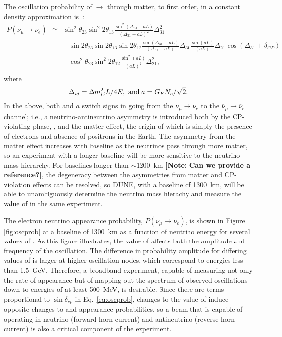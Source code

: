 The oscillation probability of \numu $\rightarrow$ \nue through matter, 
to first order, in a constant density
approximation is~\cite{Nunokawa:2007qh}:
%
\begin{eqnarray}
\label{eq:oscprob}
P(\nu_\mu \rightarrow \nu_e) & \simeq & \sin^2 \theta_{23} \sin^2 2 \theta_{13} 
\frac{ \sin^2(\Delta_{31} - aL)}{(\Delta_{31}-aL)^2} \Delta_{31}^2\\ \nonumber
& & + \sin 2 \theta_{23} \sin 2 \theta_{13} \sin 2 \theta_{12} \frac{ \sin(\Delta_{31} - aL)}{(\Delta_{31}-aL)} \Delta_{31} \frac{\sin(aL)}{(aL)} \Delta_{21} \cos (\Delta_{31} + \delta_{CP})\\ \nonumber
& & + \cos^2 \theta_{23} \sin^2 2 \theta_{12} \frac {\sin^2(aL)}{(aL)^2} \Delta_{21}^2, \\ \nonumber
\end{eqnarray}
%
where 
  \[ \Delta_{ij} = \Delta m^2_{ij} L/4E,\ {\rm and} \ a=G_F N_e /\sqrt{2}. \]
%
In the above, both \deltacp and $a$ 
switch signs in going from the
$\nu_\mu \to \nu_e$ to the $\overline{\nu}_\mu \to \overline{\nu}_e$ channel; i.e.,
a neutrino-antineutrino asymmetry is introduced both by the CP-violating
phase, \deltacp, and the matter effect, the origin of which 
is simply the presence of electrons and absence of positrons in the Earth.  
The asymmetry from the matter effect increases with baseline as the neutrinos
pass through more matter, so an experiment with a longer baseline will be
more sensitive to the neutrino mass hierarchy. For baselines longer than 
$\sim$1200~km {\bf [Note: Can we provide a reference?]}, the degeneracy between the asymmetries from matter
and CP-violation effects can be resolved, so DUNE, with a baseline of 1300~km, 
will be able to unambiguously
determine the neutrino mass hierachy and measure the value of \deltacp in the same experiment.

The electron neutrino appearance probability, $P(\nu_\mu \rightarrow \nu_e)$, 
is shown in 
Figure \ref{fig:oscprob} 
at a baseline of 1300~km as a function of neutrino 
energy for several values of \deltacp. As this figure illustrates, the value 
of \deltacp affects both the amplitude and frequency of
the oscillation. The difference in probability amplitude
for differing values of \deltacp is larger at higher oscillation nodes, which 
correspond to energies less than 1.5~GeV. Therefore, a broadband experiment, 
capable of measuring not only the rate of \nue appearance but of mapping out the 
spectrum of observed oscillations down to energies of at least 500~MeV, 
is desirable. Since there are terms proportional to $\sin\delta_{cp}$ in Eq.~\ref{eq:oscprob},
changes to the value of \deltacp induce opposite changes to \nue and
\anue appearance probabilities, so a beam that is capable of operating in
neutrino (forward horn current) and antineutrino (reverse horn current)
is also a critical component of the experiment.

